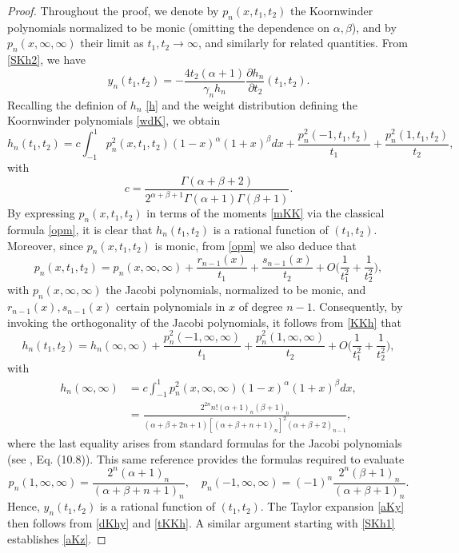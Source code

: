 \documentclass[10pt, reqno]{amsart}
\numberwithin{equation}{section}
\numberwithin{equation}{section}
\begin{document}
\begin{proof}
Throughout the proof, we denote by $p_n(x,t_1,t_2)$ the Koornwinder polynomials normalized to be monic (omitting the dependence on $\alpha, \beta$), and by $p_n(x, \infty,\infty)$ their limit as $t_1,t_2\to\infty$, and similarly for related quantities. From \eqref{SKh2}, we have
\begin{equation}
y_n(t_1,t_2)=-\frac{4t_2(\alpha+1)}{\gamma_nh_n}\frac{\partial h_n}{\partial t_2}(t_1,t_2).\label{dKhy}
\end{equation}
Recalling the definion of $h_n$ \eqref{h} and the weight distribution defining the Koornwinder polynomials \eqref{wdK}, we obtain
\begin{equation}
h_n(t_1,t_2)=c\int_{-1}^1 p_n^2(x,t_1,t_2)(1-x)^\alpha(1+x)^\beta dx+ \frac{p_n^2(-1,t_1,t_2)}{t_1}+\frac{p_n^2(1,t_1,t_2)}{t_2},\label{KKh}
\end{equation}
with 
\begin{equation*}
c=\frac{\Gamma(\alpha+\beta+2)}{2^{\alpha+\beta+1}\Gamma(\alpha+1)\Gamma(\beta+1)}.
\end{equation*} 
By expressing $p_n(x,t_1,t_2)$ in terms of the moments \eqref{mKK} via the classical formula \eqref{opm}, it is clear that $h_n(t_1,t_2)$ is a rational function of $(t_1,t_2)$. Moreover, since $p_n(x,t_1,t_2)$ is monic, from \eqref{opm} we also deduce that 
\begin{equation*}
p_n(x,t_1,t_2)=p_n(x,\infty,\infty)+\frac{r_{n-1}(x)}{t_1}+\frac{s_{n-1}(x)}{t_2}+O\Big(\frac{1}{t_1^2}+\frac{1}{t_2^2}\Big),
\end{equation*}
with $p_n(x,\infty,\infty)$ the Jacobi polynomials, normalized to be monic, and $r_{n-1}(x), s_{n-1}(x)$ certain polynomials in $x$ of degree $n-1$. Consequently, by invoking the orthogonality of the Jacobi polynomials, it follows from \eqref{KKh} that 
\begin{equation}
h_n(t_1,t_2)=h_n(\infty,\infty) +\frac{p_n^2(-1,\infty,\infty)}{t_1}+\frac{p_n^2(1,\infty,\infty)}{t_2}+O\Big(\frac{1}{t_1^2}+\frac{1}{t_2^2}\Big),\label{tKKh}
\end{equation}
with
\begin{align*}
h_n(\infty,\infty)&=c\int_{-1}^1p_n^2(x,\infty,\infty) (1-x)^\alpha(1+x)^\beta dx,\\
&=\frac{2^{2n} n!(\alpha+1)_n(\beta+1)_n}{(\alpha+\beta+2n+1)[(\alpha+\beta+n+1)_n]^2(\alpha+\beta+2)_{n-1}},
\end{align*}
where the last equality arises from standard formulas for the Jacobi polynomials (see \cite{EMOT}, Eq. (10.8)). This same reference provides the formulas required to evaluate
\begin{equation*}
p_n(1,\infty,\infty)=\frac{2^n(\alpha+1)_n}{(\alpha+\beta+n+1)_n},\quad p_n(-1,\infty,\infty)=(-1)^n\frac{2^n(\beta+1)_n}{(\alpha+\beta+1)_n}.
\end{equation*}
Hence, $y_n(t_1,t_2)$ is a rational function of $(t_1,t_2)$. The Taylor expansion \eqref{aKy} then follows from \eqref{dKhy} and \eqref{tKKh}. A similar argument starting with \eqref{SKh1} establishes \eqref{aKz}.
\end{proof}
\end{document}
